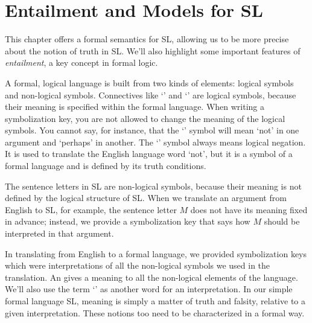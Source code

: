 \chapter{Entailment and Models for SL}
\label{ch.SLmodels}

This chapter offers a formal semantics for SL, allowing us to be more precise about the notion of truth in SL. We'll also highlight some important features of \emph{entailment}, a key concept in formal logic.

A formal, logical language is built from two kinds of elements: logical symbols and non-logical symbols. Connectives like `\eand' and `\eif' are logical symbols, because their meaning is specified within the formal language. When writing a symbolization key, you are not allowed to change the meaning of the logical symbols. You cannot say, for instance, that the `\enot' symbol will mean `not' in one argument and `perhaps' in another. The `\enot' symbol always means logical negation. It is used to translate the English language word `not', but it is a symbol of a formal language and is defined by its truth conditions.

The sentence letters in SL are non-logical symbols, because their meaning is not defined by the logical structure of SL. When we translate an argument from English to SL, for example, the sentence letter $M$ does not have its meaning fixed in advance; instead, we provide a symbolization key that says how $M$ should be interpreted in that argument.

In translating from English to a formal language, we provided symbolization keys which were interpretations of all the non-logical symbols we used in the translation. An  gives a meaning to all the non-logical elements of the language. We'll also use the term `' as another word for an interpretation. In our simple formal language SL, meaning is simply a matter of truth and falsity, relative to a given interpretation. These notions too need to be characterized in a formal way.

%
%


